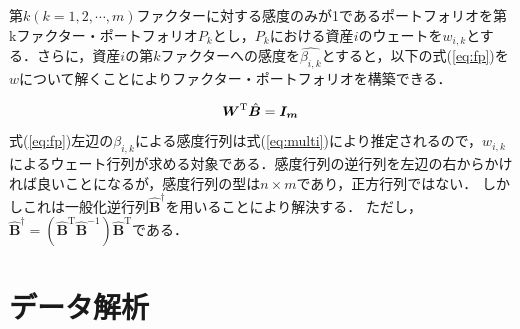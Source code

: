 ﻿\documentclass[a4paper]{jarticle}
\begin{document}
第$k(k=1,2,\cdots,m)$ファクターに対する感度のみが1であるポートフォリオを第kファクター・ポートフォリオ$P_k$とし，$P_k$における資産$i$のウェートを$w_{i,k}$とする．さらに，資産$i$の第$k$ファクターへの感度を$\hat{\beta_{i,k}}$とすると，以下の式(\ref{eq:fp})を\mbox{\boldmath $w$}について解くことによりファクター・ポートフォリオを構築できる．



\begin{equation}
\mbox{\boldmath $W$}^\text{T} \hat{\bm{B}} = \mbox{\boldmath $I_m$}
\label{eq:fp}
\end{equation}
式(\ref{eq:fp})左辺の$\beta_{i,k}$による感度行列は式(\ref{eq:multi})により推定されるので，$w_{i,k}$によるウェート行列が求める対象である．感度行列の逆行列を左辺の右からかければ良いことになるが，感度行列の型は$n\times m$であり，正方行列ではない．
しかしこれは一般化逆行列$\hat{\bm{B}}^\dag$を用いることにより解決する．
ただし，$\hat{\bm{B}}^\dag = (\hat{\bm{B}}^\text{T}\hat{\bm{B}}^{-1})\hat{\bm{B}}^\text{T}$である．







\section{データ解析}
\end{document}
